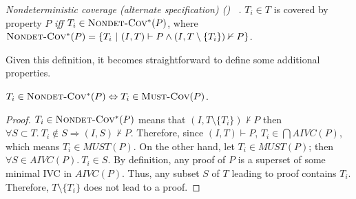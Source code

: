 \begin{definition} {\emph{Nondeterministic coverage (alternate specification) (\nondetcovalt) ~\cite{chockler2010coverage}.} }
\label{def:non-det-2}
$T_i \in T$ is covered by property $P$ \emph{iff} $T_i \in \text{\sc Nondet-Cov$^{*}$} (P)$, where
$\text{\sc Nondet-Cov$^{*}$} (P) = \{T_i~|~ (I, T) \vdash P \wedge (I, T \setminus \{T_i\}) \nvdash P\}$.
\end{definition}


%

\noindent Given this definition, it becomes straightforward to define some additional properties.

\begin{lemma}
  \label{lem:must-coverage}
$T_i \in \text{\sc Nondet-Cov$^{*}$} (P) \Leftrightarrow T_i \in \text{\sc Must-Cov}(P)$.
\end{lemma}
\begin{proof}
$T_i \in \text{\sc Nondet-Cov$^{*}$} (P)$ means that $(I, T \setminus \{ T_i \}) \nvdash P$ then
$\forall S \subset T .~ T_i \notin S \Rightarrow (I, S) \nvdash P$.
Therefore, since $(I, T) \vdash P$, $T_i \in \bigcap AIVC(P)$, which means  $T_i \in MUST(P)$.
On the other hand, let $T_i \in MUST(P)$; then $\forall S \in AIVC(P).~ T_i \in S$.
By definition, any proof of $P$ is a superset of some minimal IVC in $AIVC(P)$.
Thus, any subset $S$ of $T$ leading to proof contains $T_i$.
Therefore, $T \setminus \{ T_i \}$ does not lead to a proof.
\end{proof}
\vspace{2mm}

